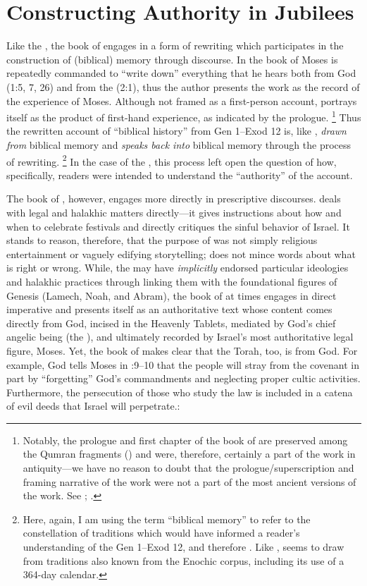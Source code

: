 
\section{Constructing Authority in Jubilees}

Like the \ga, the book of \jub engages in a form of rewriting which participates in the construction of (biblical) memory through \psgraphical discourse. In the book of \jub Moses is repeatedly commanded to ``write down'' everything that he hears both from God (1:5, 7, 26) and from the \ap (2:1), thus the author presents the work as the record of the experience of Moses. Although not framed as a first-person account, \jub portrays itself as the product of first-hand experience, as indicated by the prologue.%
    \footnote{Notably, the prologue and first chapter of the book of \jub are preserved among the Qumran fragments () and were, therefore, certainly a part of the work in antiquity---we have no reason to doubt that the prologue/superscription and framing narrative of the work were not a part of the most ancient versions of the work. See 
        \cite[1:125]{vanderkam2018};
        \cite[25]{vanderkam_metso-etal2010}.}
 Thus the rewritten account of ``biblical history'' from Gen 1--Exod 12 is, like \ga, \emph{drawn from} biblical memory and \emph{speaks back into} biblical memory through the process of rewriting.%
    \footnote{Here, again, I am using the term ``biblical memory'' to refer to the constellation of traditions which would have informed a reader's understanding of the Gen 1--Exod 12, and therefore \jub. Like \ga, \jub seems to draw from traditions also known from the Enochic corpus, including its use of a 364-day calendar.}
In the case of the \ga, this process left open the question of how, specifically, readers were intended to understand the ``authority'' of the account.

The book of \jub, however, engages more directly in prescriptive discourses. \jub deals with legal and halakhic matters directly---it gives instructions about how and when to celebrate festivals and directly critiques the sinful behavior of Israel. It stands to reason, therefore, that the purpose of \jub was not simply religious entertainment or vaguely edifying storytelling; \jub does not mince words about what is right or wrong. While, the \ga may have \emph{implicitly} endorsed particular ideologies and halakhic practices through linking them with the foundational figures of Genesis (Lamech, Noah, and Abram), the book of \jub at times engages in direct imperative and presents itself as an authoritative text whose content comes directly from God, incised in the Heavenly Tablets, mediated by God's chief angelic being (the \ap), and ultimately recorded by Israel's most authoritative legal figure, Moses. Yet, the book of \jub makes clear that the Torah, too, is from God. For example, God tells Moses in :9--10 that the people will stray from the covenant in part by ``forgetting'' God's commandments and neglecting proper cultic activities. Furthermore, the persecution of those who study the law is included in a catena of evil deeds that Israel will perpetrate.:

